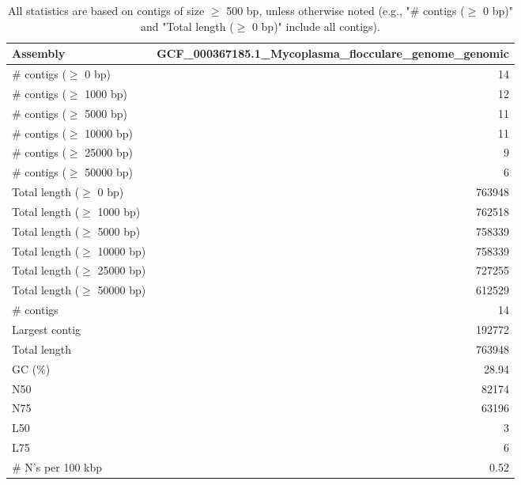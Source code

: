\documentclass[12pt,a4paper]{article}
\begin{document}
\begin{table}[ht]
\begin{center}
\caption{All statistics are based on contigs of size $\geq$ 500 bp, unless otherwise noted (e.g., "\# contigs ($\geq$ 0 bp)" and "Total length ($\geq$ 0 bp)" include all contigs).}
\begin{tabular}{|l*{1}{|r}|}
\hline
Assembly & GCF\_000367185.1\_Mycoplasma\_flocculare\_genome\_genomic \\ \hline
\# contigs ($\geq$ 0 bp) & 14 \\ \hline
\# contigs ($\geq$ 1000 bp) & 12 \\ \hline
\# contigs ($\geq$ 5000 bp) & 11 \\ \hline
\# contigs ($\geq$ 10000 bp) & 11 \\ \hline
\# contigs ($\geq$ 25000 bp) & 9 \\ \hline
\# contigs ($\geq$ 50000 bp) & 6 \\ \hline
Total length ($\geq$ 0 bp) & 763948 \\ \hline
Total length ($\geq$ 1000 bp) & 762518 \\ \hline
Total length ($\geq$ 5000 bp) & 758339 \\ \hline
Total length ($\geq$ 10000 bp) & 758339 \\ \hline
Total length ($\geq$ 25000 bp) & 727255 \\ \hline
Total length ($\geq$ 50000 bp) & 612529 \\ \hline
\# contigs & 14 \\ \hline
Largest contig & 192772 \\ \hline
Total length & 763948 \\ \hline
GC (\%) & 28.94 \\ \hline
N50 & 82174 \\ \hline
N75 & 63196 \\ \hline
L50 & 3 \\ \hline
L75 & 6 \\ \hline
\# N's per 100 kbp & 0.52 \\ \hline
\end{tabular}
\end{center}
\end{table}
\end{document}
